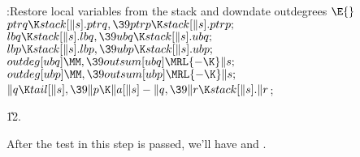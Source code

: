 \B{}:Restore local variables from the stack and downdate outdegrees%
\X${}\E{}$\6
$\\{ptrq}\K\\{stack}[\|s].\\{ptrq},\39\\{ptrp}\K\\{stack}[\|s].\\{ptrp};{}$\6
${}\\{lbq}\K\\{stack}[\|s].\\{lbq},\39\\{ubq}\K\\{stack}[\|s].\\{ubq};{}$\6
${}\\{lbp}\K\\{stack}[\|s].\\{lbp},\39\\{ubp}\K\\{stack}[\|s].\\{ubp};{}$\6
${}\\{outdeg}[\\{ubq}]\MM,\39\\{outsum}[\\{ubq}]\MRL{-{\K}}\|s;{}$\6
${}\\{outdeg}[\\{ubp}]\MM,\39\\{outsum}[\\{ubp}]\MRL{-{\K}}\|s;{}$\6
${}\|q\K\\{tail}[\|s],\39\|p\K\|a[\|s]-\|q,\39\|r\K\\{stack}[\|s].\|r{}$;\par
\U12.\fi

After the test in this step is passed, we'll have 
and .

